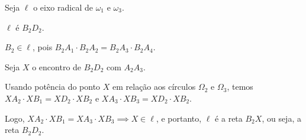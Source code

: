 Seja $\ell$ o eixo radical de $\omega_1$ e $\omega_3$. 

\begin{lem*}
	$\ell$ é $B_2D_2$.
\end{lem*}

\begin{dem}
	$B_2 \in \ell$, pois $B_2A_1 \cdot B_2A_2 = B_2A_3 \cdot B_2A_4$.

	Seja $X$ o encontro de $B_2D_2$ com $A_2A_3$.

	Usando potência do ponto $X$ em relação aos círculos $\Omega_2$ e $\Omega_3$, temos $XA_2 \cdot XB_1 = XD_2 \cdot XB_2$ e $XA_3 \cdot XB_3 = XD_2 \cdot XB_2$.

Logo, $XA_2 \cdot XB_1 = XA_3 \cdot XB_3 \implies X \in \ell$, e portanto, $\ell$ é a reta $B_2X$, ou seja, a reta $B_2D_2$.
\end{dem}
